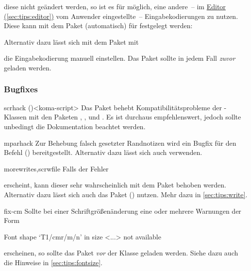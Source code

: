 \begin{packages}
  diese nicht geändert werden, so ist es für  möglich, eine 
  andere~-- im \hyperref[sec:tips:editor]{Editor (\autoref*{sec:tips:editor})} 
  vom Anwender eingestellte~-- Eingabekodierungen zu nutzen. Diese kann mit dem 
  Paket  (automatisch) für  festgelegt werden:
  \begin{Code}
    \usepackage{selinput}
  \end{Code}\vspace{-\baselineskip}%
  Alternativ dazu lässt sich mit dem Paket  mit
  \vspace{-\baselineskip}%
  die Eingabekodierung manuell einstellen. Das Paket  sollte 
  in jedem Fall \emph{zuvor} geladen werden.
\end{packages}



\subsubsection{Bugfixes}
%
\begin{packages}
\item[scrhack]()<koma-script>
  Das Paket behebt Kompatibilitätsprobleme der \KOMAScript-Klassen mit den 
  Paketen , ,  und
  . Es ist durchaus empfehlenswert, jedoch sollte unbedingt 
  die Dokumentation beachtet werden.
\item[mparhack]
  Zur Behebung falsch gesetzter Randnotizen wird ein Bugfix für den Befehl 
  () bereitgestellt. Alternativ dazu 
  lässt sich auch  verwenden.
\item[morewrites,scrwfile]
  Falls der Fehler 
  \vspace{-\baselineskip}
  erscheint, kann dieser sehr wahrscheinlich mit dem Paket  
  behoben werden. Alternativ dazu lässt sich auch das Paket 
  () nutzen. Mehr dazu in 
  \autoref{sec:tips:write}.
\item[fix-cm]
  Sollte bei einer Schriftgrößenänderung eine oder mehrere Warnungen der Form
  \begin{Code}
    Font shape `T1/cmr/m/n' in size <...> not available
  \end{Code}\vspace{-\baselineskip}%
  erscheinen, so sollte das Paket  \emph{vor} der Klasse 
  geladen werden. Siehe dazu auch die Hinweise in \autoref{sec:tips:fontsize}.
\end{packages}
